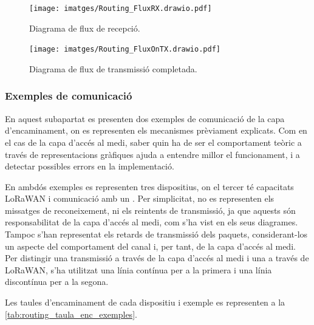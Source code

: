 \documentclass{tfgitic}[2024/07/01]
\begin{document}
{\begin{figure}
    \centering
        \texttt{[image: imatges/Routing\_FluxRX.drawio.pdf]}
    \caption{Diagrama de flux de recepció.}
    \label{fig:routing_flux_rx}
\end{figure}

\begin{figure}
    \centering
        \texttt{[image: imatges/Routing\_FluxOnTX.drawio.pdf]}
    \caption{Diagrama de flux de transmissió completada.}
    \label{fig:routing_flux_txdone}
\end{figure}

\subsubsection{Exemples de comunicació}
En aquest subapartat es presenten dos exemples de comunicació de la capa d'encaminament, on es representen els mecanismes prèviament explicats. Com en el cas de la capa d'accés al medi, saber quin ha de ser el comportament teòric a través de representacions gràfiques ajuda a entendre millor el funcionament, i a detectar possibles errors en la implementació. 

En ambdós exemples es representen tres dispositius, on el tercer té capacitats LoRaWAN i comunicació amb un . Per simplicitat, no es representen els missatges de reconeixement, ni els reintents de transmissió, ja que aquests són responsabilitat de la capa d'accés al medi, com s'ha vist en els seus diagrames. Tampoc s'han representat els retards de transmissió dels paquets, considerant-los un aspecte del comportament del canal i, per tant, de la capa d'accés al medi. Per distingir una transmissió a través de la capa d'accés al medi i una a través de LoRaWAN, s'ha utilitzat una línia contínua per a la primera i una línia discontínua per a la segona.

Les taules d'encaminament de cada dispositiu i exemple es representen a la \autoref{tab:routing_taula_enc_exemples}.

}
\end{document}
